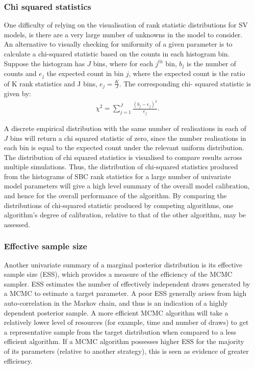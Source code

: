 \documentclass[12pt, a4paper]{article}
\begin{document}
            \subsubsection{Chi squared statistics}
            One difficulty of relying on the visualisation of rank statistic distributions for SV models, is there are a very large number of unknowns in the model to consider. An alternative to visually checking for uniformity of a given parameter is to calculate a chi-squared statistic based on the counts in each histogram bin. Suppose the histogram has $J$ bins, where for each $j^{th}$ bin, $b_j$ is the number of counts and $e_j$ the expected count in bin $j$, where the expected count is the ratio of K rank statistics and J bins, $e_j=\frac{K}{J}$. The corresponding chi- squared statistic is given by:
            \begin{align}
            \chi^2 = \sum_{j=1}^J \frac{(b_{j} - e_{j})^2}{e_j}.\end{align}
            
            A discrete empirical distribution with the same number of realisations in each of $J$ bins will return a chi squared statistic of zero, since the number realisations in each bin is equal to the expected count under the relevant  uniform distribution. The distribution of chi squared statistics is visualised to compare results across multiple simulations. Thus, the distribution of chi-squared statistics produced from the histograms of SBC rank statistics for a large number of univariate model parameters will give a high level summary of the overall model calibration, and hence for the overall performance of the algorithm. By comparing the distributions of chi-squared statistic produced by competing algorithms, one algorithm's degree of calibration, relative to that of the other algorithm, may be assessed. 

            \subsubsection{Effective sample size}
            Another univariate summary of a marginal posterior distribution is its effective sample size (ESS), which provides a measure of the efficiency of the MCMC sampler. ESS estimates the number of effectively independent draws generated by a MCMC to estimate a target parameter. A poor ESS generally arises from high auto-correlation in the Markov chain, and thus is an indication of a highly dependent posterior sample. A more efficient MCMC algorithm will take a relatively lower level of resources (for example, time and number of draws) to get a representative sample from the target distribution when compared to a less efficient algorithm. If a MCMC algorithm possesses higher ESS for the majority of its parameters (relative to another strategy), this is seen as evidence of greater efficiency.
            
\end{document}

